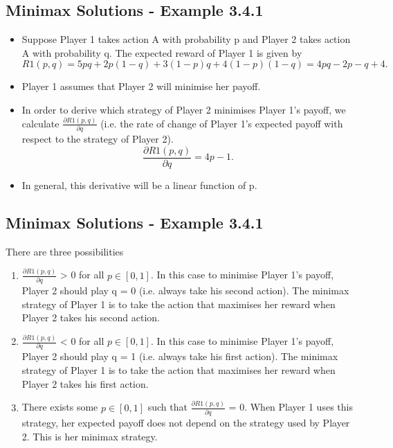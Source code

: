 \documentclass[]{article}
\begin{document}
	\subsection{Minimax Solutions - Example 3.4.1}
	\begin{itemize}
		\item Suppose Player 1 takes action A with probability p and Player 2
		takes action A with probability q. The expected reward of Player 1
		is given by
		\[R1(p, q) = 5pq+2p(1−q)+3(1−p)q+4(1−p)(1−q) = 4pq−2p−q+4.\]
		\item Player 1 assumes that Player 2 will minimise her payoff. 
		\item In order to
		derive which strategy of Player 2 minimises Player 1’s payoff, we
		calculate $\frac{\partial R1(p, q)}{\partial q}$
		(i.e. the rate of change of Player 1’s expected
		payoff with respect to the strategy of Player 2).
		\[\frac{\partial R1(p, q)}{\partial q} = 4p − 1.\]
		\item	In general, this derivative will be a linear function of p.
	\end{itemize}
	
	\subsection{Minimax Solutions - Example 3.4.1}
	There are three possibilities
	\begin{enumerate}
		\item  $\frac{\partial R1(p,q)}{\partial q}$ > 0 for all $p \in [0, 1]$. In this case to minimise
		Player 1’s payoff, Player 2 should play q = 0 (i.e.
		always take his second action). The minimax strategy
		of Player 1 is to take the action that maximises her
		reward when Player 2 takes his second action.
		\item  $\frac{\partial R1(p,q)}{\partial q}$ < 0 for all $p \in [0, 1]$. In this case to minimise
		Player 1’s payoff, Player 2 should play q = 1 (i.e.
		always take his first action). The minimax strategy of
		Player 1 is to take the action that maximises her
		reward when Player 2 takes his first action.
		\item There exists some $p \in [0, 1]$ such that $\frac{\partial R1(p,q)}{\partial q}$ = 0.
		When Player 1 uses this strategy, her expected payoff
		does not depend on the strategy used by Player 2.
		This is her minimax strategy.
	\end{enumerate}
	
\end{document}
